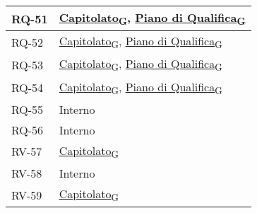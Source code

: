 \begin{longtable}{|>{\centering\arraybackslash}m{}|>{\centering\arraybackslash}m{}|}
	RQ-51              & \href{https://7last.github.io/docs/rtb/documentazione-interna/glossario\#capitolato}{Capitolato\textsubscript{G}}, \href{https://7last.github.io/docs/rtb/documentazione-interna/glossario\#piano-di-qualifica}{Piano di Qualifica\textsubscript{G}} \\\hline
	RQ-52              & \href{https://7last.github.io/docs/rtb/documentazione-interna/glossario\#capitolato}{Capitolato\textsubscript{G}}, \href{https://7last.github.io/docs/rtb/documentazione-interna/glossario\#piano-di-qualifica}{Piano di Qualifica\textsubscript{G}} \\\hline
	RQ-53              & \href{https://7last.github.io/docs/rtb/documentazione-interna/glossario\#capitolato}{Capitolato\textsubscript{G}}, \href{https://7last.github.io/docs/rtb/documentazione-interna/glossario\#piano-di-qualifica}{Piano di Qualifica\textsubscript{G}} \\\hline
	RQ-54              & \href{https://7last.github.io/docs/rtb/documentazione-interna/glossario\#capitolato}{Capitolato\textsubscript{G}}, \href{https://7last.github.io/docs/rtb/documentazione-interna/glossario\#piano-di-qualifica}{Piano di Qualifica\textsubscript{G}} \\\hline
	RQ-55              & Interno                                                                                                                                                                                                                                              \\\hline
	RQ-56              & Interno                                                                                                                                                                                                                                              \\\hline
	RV-57              & \href{https://7last.github.io/docs/rtb/documentazione-interna/glossario\#capitolato}{Capitolato\textsubscript{G}}                                                                                                                                    \\\hline
	RV-58              & Interno                                                                                                                                                                                                                                              \\\hline
	RV-59              & \href{https://7last.github.io/docs/rtb/documentazione-interna/glossario\#capitolato}{Capitolato\textsubscript{G}}                                                                                                                                    \\\hline

\end{longtable}
